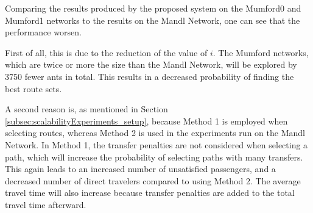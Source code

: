 Comparing the results produced by the proposed system on the Mumford0 and Mumford1 networks to the results on the Mandl Network, one can see that the performance worsen.

First of all, this is due to the reduction of the value of $i$. The Mumford networks, which are twice or more the size than the Mandl Network, will be explored by 3750 fewer ants in total. This results in a decreased probability of finding the best route sets. 

A second reason is, as mentioned in Section \vref{subsec:scalabilityExperiments_setup}, because Method 1 is employed when selecting routes, whereas Method 2 is used in the experiments run on the Mandl Network. In Method 1, the transfer penalties are not considered when selecting a path, which will increase the probability of selecting paths with many transfers. This again leads to an increased number of unsatisfied passengers, and a decreased number of direct travelers compared to using Method 2. The average travel time will also increase because transfer penalties are added to the total travel time afterward.  


